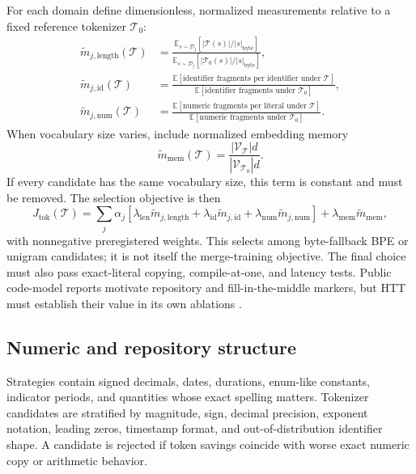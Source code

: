 \documentclass[10pt,letterpaper]{article}
\newcommand{\E}{\mathbb{E}}
\newcommand{\1}{\mathbb{1}}
\begin{document}
For each domain define dimensionless, normalized measurements relative to a fixed reference
tokenizer $\mathcal T_0$:
\begin{align}
  \widetilde m_{j,\mathrm{length}}(\mathcal T)
  &=\frac{\E_{s\sim\mathcal D_j}[|\mathcal T(s)|/|s|_{\mathrm{byte}}]}
          {\E_{s\sim\mathcal D_j}[|\mathcal T_0(s)|/|s|_{\mathrm{byte}}]},\\
  \widetilde m_{j,\mathrm{id}}(\mathcal T)
  &=\frac{\E[\text{identifier fragments per identifier under }\mathcal T]}
          {\E[\text{identifier fragments under }\mathcal T_0]},\\
  \widetilde m_{j,\mathrm{num}}(\mathcal T)
  &=\frac{\E[\text{numeric fragments per literal under }\mathcal T]}
          {\E[\text{numeric fragments under }\mathcal T_0]}.
\end{align}
When vocabulary size varies, include normalized embedding memory
\begin{equation}
  \widetilde m_{\mathrm{mem}}(\mathcal T)
  =\frac{|\mathcal V_{\mathcal T}|d}{|\mathcal V_{\mathcal T_0}|d}.
\end{equation}
If every candidate has the same vocabulary size, this term is constant and must be removed.  The
selection objective is then
\begin{equation}
  J_{\mathrm{tok}}(\mathcal T)
  =\sum_j\alpha_j\left[
     \lambda_{\mathrm{len}}\widetilde m_{j,\mathrm{length}}
    +\lambda_{\mathrm{id}}\widetilde m_{j,\mathrm{id}}
    +\lambda_{\mathrm{num}}\widetilde m_{j,\mathrm{num}}
  \right]
  +\lambda_{\mathrm{mem}}\widetilde m_{\mathrm{mem}},
  \label{eq:tokenizer-objective}
\end{equation}
with nonnegative preregistered weights.  This selects among byte-fallback BPE or unigram candidates;
it is not itself the merge-training objective.  The final choice must also pass exact-literal copying,
compile-at-one, and latency tests.  Public code-model reports motivate repository and fill-in-the-middle
markers, but HTT must establish their value in its own ablations
\cite{allal2023santacoder,bavarian2022fim,hui2024qwen25}.

\subsection{Numeric and repository structure}

Strategies contain signed decimals, dates, durations, enum-like constants, indicator periods, and
quantities whose exact spelling matters.  Tokenizer candidates are stratified by magnitude, sign,
decimal precision, exponent notation, leading zeros, timestamp format, and out-of-distribution
identifier shape.  A candidate is rejected if token savings coincide with worse exact numeric copy or
arithmetic behavior.
\end{document}
